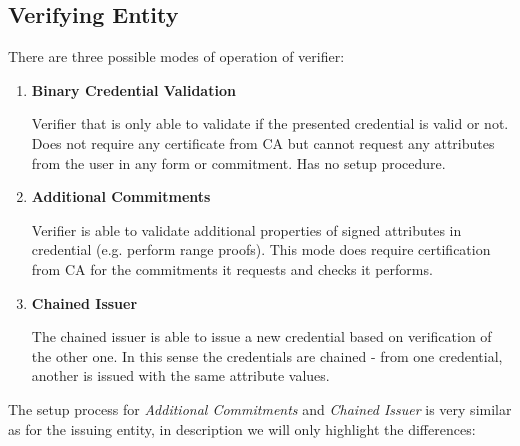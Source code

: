 \subsection{Verifying Entity}

There are three possible modes of operation of verifier:
\begin{enumerate}
    \item \textbf{Binary Credential Validation}
    
    Verifier that is only able to validate if the presented credential is valid or not. Does not require any certificate from CA but cannot request any attributes from the user in any form or commitment. Has no setup procedure.
    
    \item \textbf{Additional Commitments}
    
    Verifier is able to validate additional properties of signed attributes in credential (e.g. perform range proofs). This mode does require certification from CA for the commitments it requests and checks it performs.
    
    \item \textbf{Chained Issuer}
    
    The chained issuer is able to issue a new credential based on verification of the other one. In this sense the credentials are chained - from one credential, another is issued with the same attribute values.
\end{enumerate}
The setup process for \textit{Additional Commitments} and \textit{Chained Issuer} is very similar as for the issuing entity, in description we will only highlight the differences:
